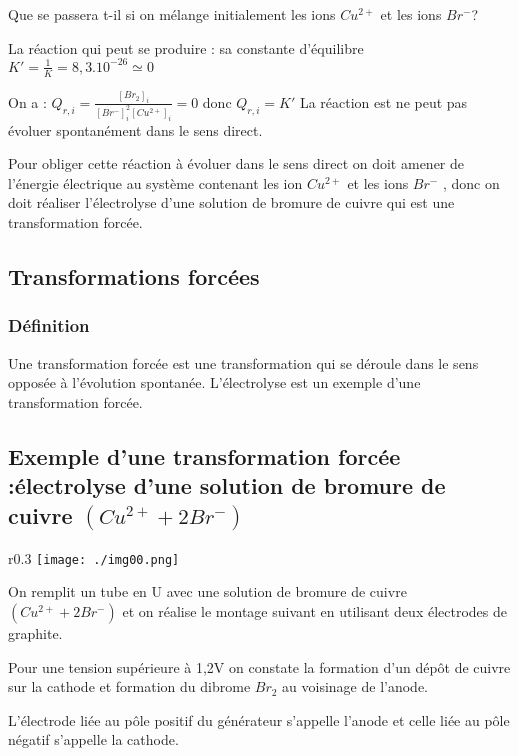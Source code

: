 \documentclass[12pt]{article}
\begin{document}
\begin{tcolorbox}
Que se passera t-il si on mélange initialement les ions $Cu^{2+}$ et les ions $Br^-$?

La réaction qui peut se produire :  sa constante d'équilibre $K'=\frac{1}{K} = 8,3.10^{-26} \simeq  0$ 


On a : $Q_{r,i} = \frac{[Br_2]_i}{[Br^-]^2_i[Cu^{2+}]_i} = 0$ donc $Q_{r,i}=K'$  La réaction est ne peut pas évoluer spontanément dans le sens direct.

Pour obliger cette réaction à évoluer dans le sens direct on doit amener de l'énergie électrique au système
contenant les ion $Cu^{2+}$ et les ions $Br^-$
, donc on doit réaliser l'électrolyse d'une solution de bromure de cuivre
qui est une transformation forcée.
\end{tcolorbox}




\subsection{Transformations forcées }
\subsubsection{Définition }
Une transformation forcée est une transformation qui se déroule dans le sens opposée à l'évolution spontanée.
L'électrolyse est un exemple d'une transformation forcée.

\subsection{Exemple d'une transformation forcée :électrolyse d'une solution de bromure de cuivre $(Cu^{2+} + 2Br^-)$}

\begin{wrapfigure}{r}{0.3\textwidth}
	\texttt{[image: ./img00.png]}
\end{wrapfigure}

On remplit un tube en U avec une solution de bromure de cuivre  $(Cu^{2+} + 2Br^-)$ et on réalise le montage suivant en utilisant deux électrodes de graphite.


Pour une tension supérieure à 1,2V on constate la formation d'un dépôt de cuivre sur la cathode et formation du dibrome $Br_2$
au voisinage de l'anode.

L'électrode liée au pôle positif du générateur s'appelle l'anode et celle liée au pôle négatif s'appelle la cathode.
\end{document}
